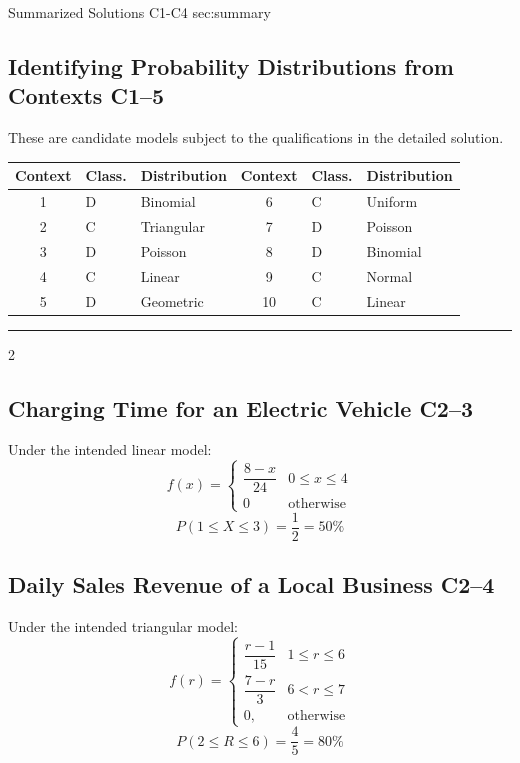 	\sectionScored
	{Summarized Solutions}
	{C1-C4}
	{sec:summary}
	{
		\subsection{Identifying Probability Distributions from Contexts \hfill C1--5}
		These are candidate models subject to the qualifications in the detailed solution.
		\begin{center}
			\begin{tabular}{cll@{\qquad}cll}
				\toprule
				Context & Class. & Distribution & Context & Class. & Distribution \\
				\midrule
				1 & D & Binomial   & 6  & C & Uniform \\
				2 & C & Triangular & 7  & D & Poisson \\
				3 & D & Poisson    & 8  & D & Binomial \\
				4 & C & Linear     & 9  & C & Normal \\
				5 & D & Geometric  & 10 & C & Linear \\
				\bottomrule
			\end{tabular}
		\end{center}
	
		\setlength{\columnseprule}{0.4pt}
		\noindent\rule{\textwidth}{0.5pt}
	
		\begin{multicols}{2}
		\subsection{Charging Time for an Electric Vehicle \hfill C2--3}
		Under the intended linear model:
		\[
		f(x)=
		\begin{cases}
			\dfrac{8-x}{24}&0\le x\le4\\[1mm]
			0&\text{otherwise}
		\end{cases}
		\]\[
		\boxed{P(1\le X\le3)=\frac12=50\%}
		\]

		\subsection{Daily Sales Revenue of a Local Business \hfill C2--4}
		Under the intended triangular model:
		\[
		f(r)=
		\begin{cases}
			\dfrac{r-1}{15}&1\le r\le6\\[1mm]
			\dfrac{7-r}{3}&6<r\le7\\[1mm]
			0,&\text{otherwise}
		\end{cases}
		\]\[
		\boxed{P(2\le R\le6)=\frac45=80\%}
		\]
		\end{multicols}
		
}
